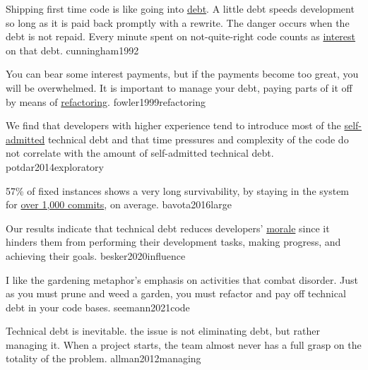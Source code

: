 \documentclass{article}
\begin{document}

  {Shipping first time code is like going into \ul{debt}. A little debt speeds development so long as it is paid back promptly with a rewrite. The danger occurs when the debt is not repaid. Every minute spent on not-quite-right code counts as \ul{interest} on that debt.}
  {cunningham1992}

  {You can bear some interest payments, but if the payments become too great, you will be overwhelmed. It is important to manage your debt, paying parts of it off by means of \ul{refactoring}.}
  {fowler1999refactoring}

  {We find that developers with higher experience tend to introduce most of the \ul{self-admitted} technical debt and that time pressures and complexity of the code do not correlate with the amount of self-admitted technical debt.}
  {potdar2014exploratory}

  {57\% of fixed instances shows a very long survivability, by staying in the system for \ul{over 1,000 commits}, on average.}
  {bavota2016large}

  {Our results indicate that technical debt reduces developers' \ul{morale} since it hinders them from performing their development tasks, making progress, and achieving their goals.}
  {besker2020influence}

  {I like the gardening metaphor's emphasis on activities that combat disorder. Just as you must prune and weed a garden, you must refactor and pay off technical debt in your code bases.}
  {seemann2021code}


  {Technical debt is inevitable. the issue is not eliminating debt, but rather managing it. When a project starts, the team almost never has a full grasp on the totality of the problem.}
  {allman2012managing}
\end{document}
